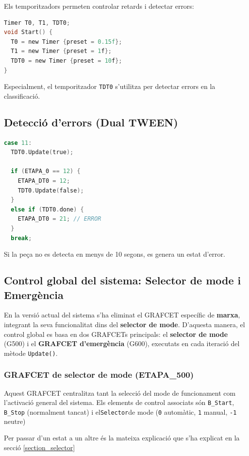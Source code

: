 \documentclass[12pt,a4paper]{report}
\begin{document}
Els temporitzadors permeten controlar retards i detectar errors:

\begin{lstlisting}[language=C]
Timer T0, T1, TDT0;
void Start() {
  T0 = new Timer {preset = 0.15f};
  T1 = new Timer {preset = 1f};
  TDT0 = new Timer {preset = 10f};
}
\end{lstlisting}

Especialment, el temporitzador \texttt{TDT0} s'utilitza per detectar errors en la classificació.

\subsection{Detecció d'errors (Dual TWEEN)}

\begin{lstlisting}[language=C]
case 11:
  TDT0.Update(true);

  if (ETAPA_0 == 12) {
    ETAPA_DT0 = 12;
    TDT0.Update(false);
  }
  else if (TDT0.done) {
    ETAPA_DT0 = 21; // ERROR
  }
  break;
\end{lstlisting}

Si la peça no es detecta en menys de 10 segons, es genera un estat d'error.
\subsection{Control global del sistema: Selector de mode i Emergència}

En la versió actual del sistema s'ha eliminat el GRAFCET específic de \textbf{marxa}, integrant la seva funcionalitat dins del \textbf{selector de mode}. D'aquesta manera, el control global es basa en dos GRAFCETs principals: el \textbf{selector de mode} (G500) i el \textbf{GRAFCET d'emergència} (G600), executats en cada iteració del mètode \texttt{Update()}.

\subsubsection{GRAFCET de selector de mode (ETAPA\_500)}

Aquest GRAFCET centralitza tant la selecció del mode de funcionament com l'activació general del sistema. Els elements de control associats són \texttt{B\_Start}, \texttt{B\_Stop} (normalment tancat) i el\texttt{Selector}de mode (\texttt{0} automàtic, \texttt{1} manual, \texttt{-1} neutre)

Per passar d'un estat a un altre és la mateixa explicació que s'ha explicat en la secció \ref{section_selector}
\end{document}
